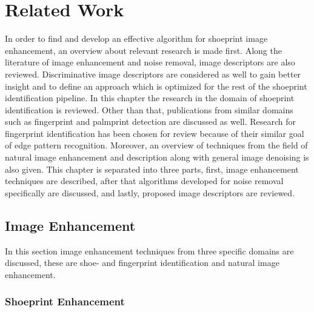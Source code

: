 \documentclass[draft,final]{vutinfth} %
\begin{document}
\chapter{Related Work}
\par
In order to find and develop an effective algorithm for shoeprint image enhancement, an overview about relevant research is made first.
Along the literature of image enhancement and noise removal, image descriptors are also reviewed.
Discriminative image descriptors are considered as well to gain better insight and to define an approach which is optimized for the rest of the shoeprint identification pipeline.
In this chapter the research in the domain of shoeprint identification is reviewed.
Other than that, publications from similar domains such as fingerprint and palmprint detection are discussed as well.
Research for fingerprint identification has been chosen for review because of their similar goal of edge pattern recognition.
Moreover, an overview of techniques from the field of natural image enhancement and description along with general image denoising is also given.
This chapter is separated into three parts, first, image enhancement techniques are described, after that algorithms developed for noise removal specifically are discussed, and lastly, proposed image descriptors are reviewed.


\section{Image Enhancement}
\label{sec:rw:ImageENhancement}

In this section image enhancement techniques from three specific domains are discussed, these are shoe- and fingerprint identification and natural image enhancement.

\subsection{Shoeprint Enhancement}
\end{document}
